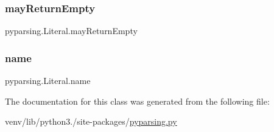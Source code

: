 \mbox{\label{classpyparsing_1_1Literal_a074c101847c2ad122c48e058d4c7c602}} 
\subsubsection{\texorpdfstring{may\+Return\+Empty}{mayReturnEmpty}}
{\footnotesize\ttfamily pyparsing.\+Literal.\+may\+Return\+Empty}

\mbox{\label{classpyparsing_1_1Literal_a48d01fabdbe2ba85e4191118de141afa}} 
\subsubsection{\texorpdfstring{name}{name}}
{\footnotesize\ttfamily pyparsing.\+Literal.\+name}



The documentation for this class was generated from the following file\+:\begin{DoxyCompactItemize}
\item 
venv/lib/python3./site-\/packages/\hyperlink{pyparsing_8py}{pyparsing.\+py}\end{DoxyCompactItemize}
